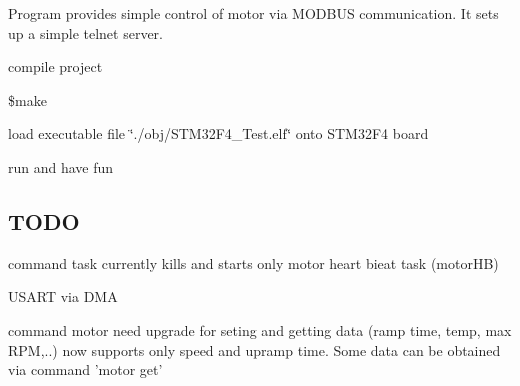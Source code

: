 Program provides simple control of motor via M\+O\+D\+B\+U\+S communication. It sets up a simple telnet server.


\begin{DoxyItemize}
\item compile project
\end{DoxyItemize}

\$make


\begin{DoxyItemize}
\item load executable file \char`\"{}./obj/\+S\+T\+M32\+F4\+\_\+\+Test.\+elf\char`\"{} onto S\+T\+M32\+F4 board
\item run and have fun
\end{DoxyItemize}

\subsection*{T\+O\+D\+O }


\begin{DoxyItemize}
\item command task currently kills and starts only motor heart bieat task (motor\+H\+B)
\item U\+S\+A\+R\+T via D\+M\+A
\item command motor need upgrade for seting and getting data (ramp time, temp, max R\+P\+M,..) now supports only speed and upramp time. Some data can be obtained via command 'motor get'
\item 
\end{DoxyItemize}
